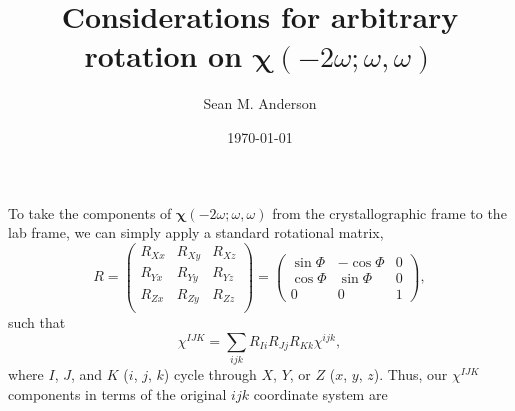 \documentclass[aps,prb,10pt,letterpaper,notitlepage]{revtex4-1}
\begin{document}
\title{Considerations for arbitrary rotation on
\texorpdfstring{$\boldsymbol{\chi}(-2\omega;\omega,\omega)$}{X(2w)}}
\author{Sean M. Anderson}
\date{\today}

\maketitle

To take the components of $\boldsymbol{\chi}(-2\omega;\omega,\omega)$ from the
crystallographic frame to the lab frame, we can simply apply a standard
rotational matrix,
\begin{equation*}
R =
\begin{pmatrix}
R_{Xx} & R_{Xy} & R_{Xz} \\
R_{Yx} & R_{Yy} & R_{Yz} \\
R_{Zx} & R_{Zy} & R_{Zz} \\
\end{pmatrix}
=
\begin{pmatrix}
\sin\Phi & -\cos\Phi & 0 \\
\cos\Phi &  \sin\Phi & 0 \\
    0    &      0    & 1
\end{pmatrix},
\end{equation*}
such that
\begin{equation*}
\chi^{IJK} = \sum_{ijk}R_{Ii}R_{Jj}R_{Kk}\chi^{ijk},
\end{equation*}
where $I$, $J$, and $K$ ($i$, $j$, $k$) cycle through $X$, $Y$, or $Z$ ($x$,
$y$, $z$). Thus, our $\chi^{IJK}$ components in terms of the original $ijk$
coordinate system are
\end{document}
